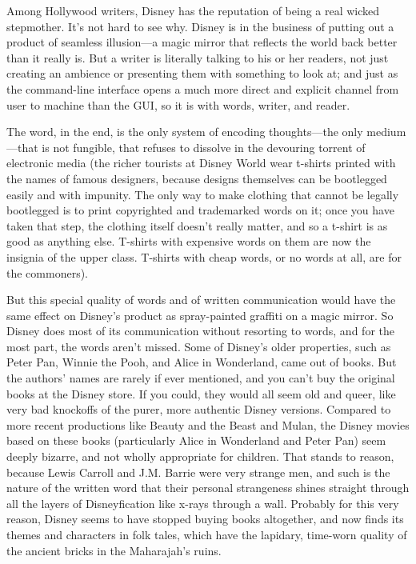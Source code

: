 \documentclass[
  fontsize=11pt,
  paper=landscape,
  twocolumn=true,
  pagesize=pdftex,
  headings=small,
  DIV=15,
  ]{scrartcl}
\begin{document}
Among Hollywood writers, Disney has the reputation of being a real
wicked stepmother. It's not hard to see why. Disney is in the business
of putting out a product of seamless illusion---a magic mirror that
reflects the world back better than it really is. But a writer is
literally talking to his or her readers, not just creating an ambience
or presenting them with something to look at; and just as the
command-line interface opens a much more direct and explicit channel
from user to machine than the GUI, so it is with words, writer, and
reader.

The word, in the end, is the only system of encoding thoughts---the only
medium---that is not fungible, that refuses to dissolve in the devouring
torrent of electronic media (the richer tourists at Disney World wear
t-shirts printed with the names of famous designers, because designs
themselves can be bootlegged easily and with impunity. The only way to
make clothing that cannot be legally bootlegged is to print copyrighted
and trademarked words on it; once you have taken that step, the clothing
itself doesn't really matter, and so a t-shirt is as good as anything
else. T-shirts with expensive words on them are now the insignia of the
upper class. T-shirts with cheap words, or no words at all, are for the
commoners).

But this special quality of words and of written communication would
have the same effect on Disney's product as spray-painted graffiti on a
magic mirror. So Disney does most of its communication without resorting
to words, and for the most part, the words aren't missed. Some of
Disney's older properties, such as Peter Pan, Winnie the Pooh, and Alice
in Wonderland, came out of books. But the authors' names are rarely if
ever mentioned, and you can't buy the original books at the Disney
store. If you could, they would all seem old and queer, like very bad
knockoffs of the purer, more authentic Disney versions. Compared to more
recent productions like Beauty and the Beast and Mulan, the Disney
movies based on these books (particularly Alice in Wonderland and Peter
Pan) seem deeply bizarre, and not wholly appropriate for children. That
stands to reason, because Lewis Carroll and J.M. Barrie were very
strange men, and such is the nature of the written word that their
personal strangeness shines straight through all the layers of
Disneyfication like x-rays through a wall. Probably for this very
reason, Disney seems to have stopped buying books altogether, and now
finds its themes and characters in folk tales, which have the lapidary,
time-worn quality of the ancient bricks in the Maharajah's ruins.
\end{document}
